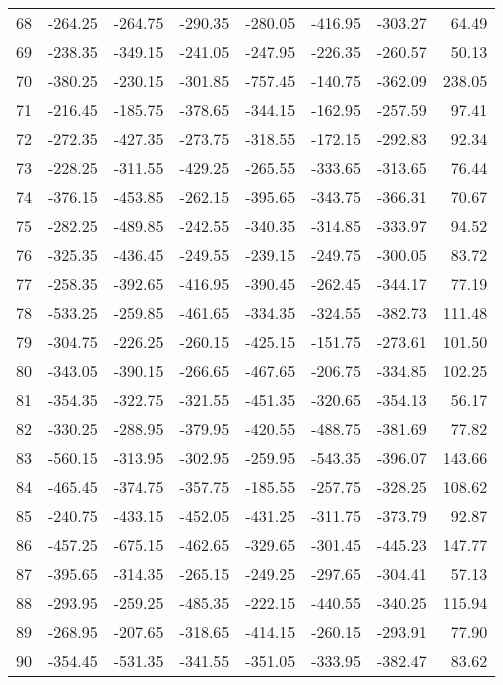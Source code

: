 \begin{longtable}{rrrrrrrr}
68 & -264.25 & -264.75 & -290.35 & -280.05 & -416.95 & -303.27 & 64.49  \\
69 & -238.35 & -349.15 & -241.05 & -247.95 & -226.35 & -260.57 & 50.13  \\
70 & -380.25 & -230.15 & -301.85 & -757.45 & -140.75 & -362.09 & 238.05  \\
71 & -216.45 & -185.75 & -378.65 & -344.15 & -162.95 & -257.59 & 97.41  \\
72 & -272.35 & -427.35 & -273.75 & -318.55 & -172.15 & -292.83 & 92.34  \\
73 & -228.25 & -311.55 & -429.25 & -265.55 & -333.65 & -313.65 & 76.44  \\
74 & -376.15 & -453.85 & -262.15 & -395.65 & -343.75 & -366.31 & 70.67  \\
75 & -282.25 & -489.85 & -242.55 & -340.35 & -314.85 & -333.97 & 94.52  \\
76 & -325.35 & -436.45 & -249.55 & -239.15 & -249.75 & -300.05 & 83.72  \\
77 & -258.35 & -392.65 & -416.95 & -390.45 & -262.45 & -344.17 & 77.19  \\
78 & -533.25 & -259.85 & -461.65 & -334.35 & -324.55 & -382.73 & 111.48  \\
79 & -304.75 & -226.25 & -260.15 & -425.15 & -151.75 & -273.61 & 101.50  \\
80 & -343.05 & -390.15 & -266.65 & -467.65 & -206.75 & -334.85 & 102.25  \\
81 & -354.35 & -322.75 & -321.55 & -451.35 & -320.65 & -354.13 & 56.17  \\
82 & -330.25 & -288.95 & -379.95 & -420.55 & -488.75 & -381.69 & 77.82  \\
83 & -560.15 & -313.95 & -302.95 & -259.95 & -543.35 & -396.07 & 143.66  \\
84 & -465.45 & -374.75 & -357.75 & -185.55 & -257.75 & -328.25 & 108.62  \\
85 & -240.75 & -433.15 & -452.05 & -431.25 & -311.75 & -373.79 & 92.87  \\
86 & -457.25 & -675.15 & -462.65 & -329.65 & -301.45 & -445.23 & 147.77  \\
87 & -395.65 & -314.35 & -265.15 & -249.25 & -297.65 & -304.41 & 57.13  \\
88 & -293.95 & -259.25 & -485.35 & -222.15 & -440.55 & -340.25 & 115.94  \\
89 & -268.95 & -207.65 & -318.65 & -414.15 & -260.15 & -293.91 & 77.90  \\
90 & -354.45 & -531.35 & -341.55 & -351.05 & -333.95 & -382.47 & 83.62  \\

\end{longtable}
